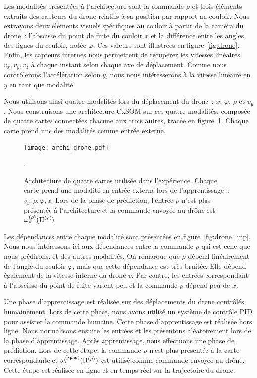 \documentclass[../main]{subfiles}
\begin{document}
Les modalités présentées à l'architecture sont la commande $\rho$ et trois éléments extraits des capteurs du drone relatifs à sa position par rapport au couloir.
Nous extrayons deux éléments visuels spécifiques au couloir à partir de la caméra du drone~: l'abscisse du point de fuite du couloir $x$ et la différence entre les angles des lignes du couloir, notée $\varphi$.
Ces valeurs sont illustrées en figure~\ref{fig:drone}.
Enfin, les capteurs internes nous permettent de récupérer les vitesses linéaires $v_x,v_y,v_z$ à chaque instant selon chaque axe de déplacement. Comme nous contrôlerons l'accélération selon $y$, nous nous intéresserons à la vitesse linéaire en $y$ en tant que modalité.

Nous utilisons ainsi quatre modalités lors du déplacement du drone~: $x$, $\varphi$, $\rho$ et $v_y$.
Nous construisons une architecture CxSOM sur ces quatre modalités, composée de quatre cartes connectées chacune aux trois autres, tracée en figure~\ref{fig:archi_drone}. Chaque carte prend une des modalités comme entrée externe.


\begin{figure}
	\centering\texttt{[image: archi\_drone.pdf]}
	\caption{Architecture de quatre cartes utilisée dans l'expérience. Chaque carte prend une modalité en entrée externe lors de l'apprentissage~: $v_y,\rho,\varphi,x$. Lors de la phase de prédiction, l'entrée $\rho$ n'est plus présentée à l'architecture et la commande envoyée au drône est $\omega_e^{({\rho})}(\Pi^{({\rho})})$\label{fig:archi_drone}}.
\end{figure}

Les dépendances entre chaque modalité sont présentées en figure~\ref{fig:drone_inp}. Nous nous intéressons ici aux dépendances entre la commande $\rho$ qui est celle que nous prédirons, et des autres modalités.
On remarque que $\rho$ dépend linéairement de l'angle du couloir $\varphi$, mais que cette dépendance est très bruitée. Elle dépend également de la vitesse interne du drone $v$. Par contre, les entrées correspondant à l'abscisse du point de fuite varient peu et la commande $\rho$ dépend peu de $x$.

Une phase d'apprentissage est réalisée sur des déplacements du drone contrôlés humainement. Lors de cette phase, nous avons utilisé un système de contrôle PID pour assister la commande humaine. 
Cette phase d'apprentissage est réalisée hors ligne. Nous normalisons ensuite les entrées et les présentons aléatoirement lors de la phase d'apprentissage.
Après apprentissage, nous effectuons une phase de prédiction. Lors de cette étape, la commande $\rho$ n'est plus présentée à la carte correspondante et $\w_e\m{\pho}(\bmu\m{\rho})$ est utilisé comme commande envoyée au drône.
Cette étape est réalisée en ligne et en temps réel sur la trajectoire du drone.
\end{document}
